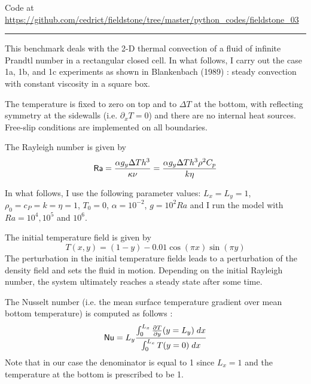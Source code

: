 

\begin{center}
Code at \url{https://github.com/cedrict/fieldstone/tree/master/python_codes/fieldstone_03}
\end{center}

\par\noindent\rule{\textwidth}{0.4pt}

This benchmark deals with the 2-D thermal convection of a fluid 
of infinite Prandtl number in a rectangular closed cell.
In what follows, I carry out the case 1a, 1b, and 1c experiments as shown in 
Blankenbach \etal (1989) \cite{blbc89}:
steady convection with constant viscosity in a square box.

The temperature is fixed to zero on top and to $\Delta T$ at the bottom, 
with reflecting symmetry at the sidewalls (i.e. $\partial_x T=0$) 
and there are no internal heat sources. 
Free-slip conditions are implemented on all boundaries. 

The Rayleigh number is given by
\begin{equation}
{\mathsf{Ra}} = \frac{\alpha g_y \Delta T h^3 }{\kappa \nu}
=\frac{\alpha g_y \Delta T h^3 \rho^2 C_p}{k \eta}
\end{equation}

In what follows, I use the following parameter values:  %
$L_x=L_y=1$,$\rho_0=c_P=k=\eta=1$, $T_0=0$, $\alpha=10^{-2}$, $g=10^{2}Ra$
and I run the model with $Ra=10^4,10^{5}$ and $10^6$.

The initial temperature field is given by 
\begin{equation}
T(x,y)=(1-y) - 0.01\cos(\pi x) \sin(\pi y)
\end{equation}
The perturbation in the initial temperature fields leads to 
a perturbation of the density field and sets the fluid in motion. 
Depending on the initial Rayleigh number, the system ultimately reaches a 
steady state after some time. 

The Nusselt number (i.e. the mean surface temperature gradient over mean bottom temperature)
is computed as follows \cite{blbc89}:
\begin{equation}
{\mathsf{Nu}} = L_y \frac{\int_0^{L_x} \frac{\partial T}{\partial y}(y=L_y) \; dx  }{\int_0^{L_x} T(y=0) \; dx}
\label{eqNu}
\end{equation}
Note that in our case the denominator is equal to 1 since $L_x=1$ and the temperature at the 
bottom is prescribed to be 1.

